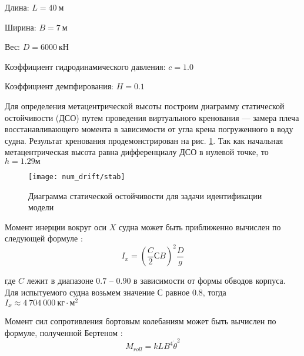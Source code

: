 \begin{description}
	\item	Длина: $L = 40\ \text{м}$
	\item	Ширина: $B = 7\ \text{м}$
	\item	Вес: $D = 6 000\ \text{кН}$
	\item	Коэффициент гидродинамического давления: $c = 1.0$
	\item	Коэффициент демпфирования: $H = 0.1$
\end{description}

Для определения метацентрической высоты построим диаграмму статической остойчивости (ДСО) путем проведения виртуального кренования --- замера плеча восстанавливающего момента в зависимости от угла крена погруженного в воду судна. Результат кренования продемонстрирован на рис. \ref{drift:stab}. Так как начальная метацентрическая высота равна дифференциалу ДСО в нулевой точке, то $h=1.29 м$

\begin{figure}[h!]
\begin{center}
\texttt{[image: num\_drift/stab]}
\end{center}
\caption{Диаграмма статической остойчивости для задачи идентификации модели}
\label{drift:stab}
\end{figure}


Момент инерции вокруг оси $X$ судна может быть приближенно вычислен по следующей формуле \citep{hanovich47}:
\begin{equation}
	I_{x} = (\frac{C}{2}СB)^2 \frac{D}{g}
	\label{roll_torque}
\end{equation}


где $C$ лежит в диапазоне $0.7$ -- $0.90$ в зависимости от формы обводов корпуса. Для испытуемого судна возьмем значение $С$ равное $0.8$, тогда $I_x \approx 4\ 704\ 000\ \text{кг}\cdot \text{м}^2$

Момент сил сопротивления бортовым колебаниям может быть вычислен по формуле, полученной Бертеном \citep{hanovich47}:
\begin{equation}
	M_{roll} = kLB^4\dot{\theta}^2
	\label{roll_torque}
\end{equation}

